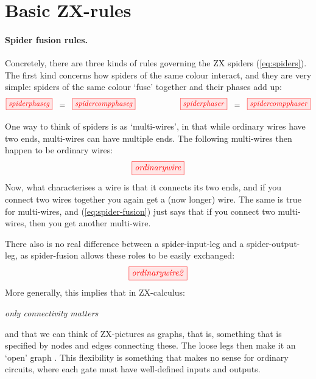 \documentclass[11pt]{article}
\theoremstyle{definition}
\newcommand{\beq}{\begin{equation}}
\newcommand{\eeq}{\end{equation}\par\noindent}
\begin{document}
\section{Basic ZX-rules}

\paragraph{Spider fusion rules.} Concretely, there are three kinds of rules governing the  ZX spiders (\ref{eq:spiders}).  The first kind concerns how spiders of the same colour interact, and they are very simple: spiders of the same colour `fuse' together and their phases add up:
\beq\label{eq:spider-fusion}
\tikzfig{spiderphaseg}\ \ =\ \ \tikzfig{spidercompphaseg}  
\qquad\qquad\qquad
\tikzfig{spiderphaser}\ \ =\ \ \tikzfig{spidercompphaser}
\eeq

One way to think of spiders is as `multi-wires', in that while ordinary wires have two ends, multi-wires can have multiple ends.  The following multi-wires then happen to be ordinary wires:  
\[
\tikzfig{ordinarywire}  
\]
Now, what characterises a wire is that it connects its two ends, and if you connect two wires together you again get a (now longer) wire. The same is true for multi-wires, and  (\ref{eq:spider-fusion}) just says that if you connect two multi-wires, then you get another multi-wire.

There also is no real difference between a spider-input-leg and a spider-output-leg, as spider-fusion allows these roles to be easily exchanged:  
\[
\tikzfig{ordinarywire2}  
\]
More generally, this implies that in ZX-calculus: 
\begin{center}
\em  only connectivity matters
\end{center}
and that we can think of ZX-pictures as graphs, that is, something that is specified by  nodes and edges connecting these. The loose legs then make it an `open' graph \cite{DK}. This flexibility is something that makes no sense for ordinary circuits, where each gate must have well-defined inputs and outputs.
\end{document}
